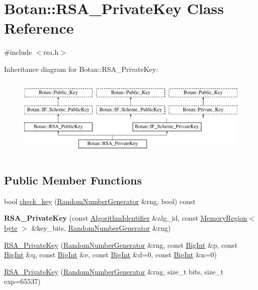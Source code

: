 \hypertarget{classBotan_1_1RSA__PrivateKey}{\section{Botan\-:\-:R\-S\-A\-\_\-\-Private\-Key Class Reference}
\label{classBotan_1_1RSA__PrivateKey}
}


{\ttfamily \#include $<$rsa.\-h$>$}

Inheritance diagram for Botan\-:\-:R\-S\-A\-\_\-\-Private\-Key\-:\begin{figure}[H]
\begin{center}
\leavevmode
\includegraphics[height=3.929825cm]{classBotan_1_1RSA__PrivateKey}
\end{center}
\end{figure}
\subsection*{Public Member Functions}
\begin{DoxyCompactItemize}
\item 
bool \hyperlink{classBotan_1_1RSA__PrivateKey_ad25e35ed7bf2c00194546030157f8286}{check\-\_\-key} (\hyperlink{classBotan_1_1RandomNumberGenerator}{Random\-Number\-Generator} \&rng, bool) const 
\item 
\hypertarget{classBotan_1_1RSA__PrivateKey_acc39ee4d7dc5151837315f3c5dc79d74}{{\bfseries R\-S\-A\-\_\-\-Private\-Key} (const \hyperlink{classBotan_1_1AlgorithmIdentifier}{Algorithm\-Identifier} \&alg\-\_\-id, const \hyperlink{classBotan_1_1MemoryRegion}{Memory\-Region}$<$ \hyperlink{namespaceBotan_a7d793989d801281df48c6b19616b8b84}{byte} $>$ \&key\-\_\-bits, \hyperlink{classBotan_1_1RandomNumberGenerator}{Random\-Number\-Generator} \&rng)}\label{classBotan_1_1RSA__PrivateKey_acc39ee4d7dc5151837315f3c5dc79d74}

\item 
\hyperlink{classBotan_1_1RSA__PrivateKey_a730b7179cd58a9f00acab1c65df54241}{R\-S\-A\-\_\-\-Private\-Key} (\hyperlink{classBotan_1_1RandomNumberGenerator}{Random\-Number\-Generator} \&rng, const \hyperlink{classBotan_1_1BigInt}{Big\-Int} \&p, const \hyperlink{classBotan_1_1BigInt}{Big\-Int} \&q, const \hyperlink{classBotan_1_1BigInt}{Big\-Int} \&e, const \hyperlink{classBotan_1_1BigInt}{Big\-Int} \&d=0, const \hyperlink{classBotan_1_1BigInt}{Big\-Int} \&n=0)
\item 
\hyperlink{classBotan_1_1RSA__PrivateKey_acd7b366cd79320103c1c7c449fb02483}{R\-S\-A\-\_\-\-Private\-Key} (\hyperlink{classBotan_1_1RandomNumberGenerator}{Random\-Number\-Generator} \&rng, size\-\_\-t bits, size\-\_\-t exp=65537)
\end{DoxyCompactItemize}
